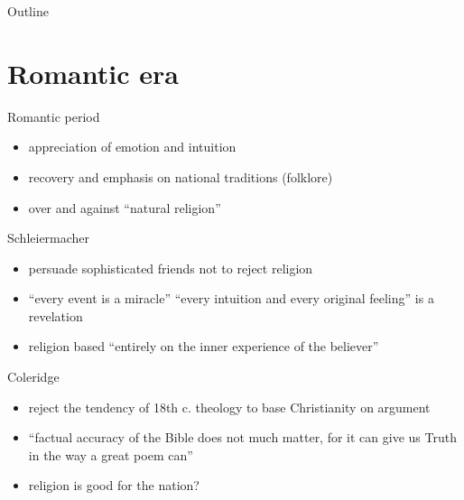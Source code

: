 

\maketitle
\begin{frame}{Outline}
\setcounter{tocdepth}{1}
\tableofcontents
\end{frame}

\section{Romantic era}
\label{sec-1}
\begin{frame}[label=sec-1-1]{Romantic period}
\begin{itemize}
\item appreciation of emotion and intuition
\item recovery and emphasis on national traditions (folklore)
\item over and against ``natural religion''
\end{itemize}
\end{frame}
\begin{frame}[label=sec-1-2]{Schleiermacher}
\begin{itemize}
\item persuade sophisticated friends not to reject religion
\item ``every event is a miracle'' ``every intuition and every original feeling'' is a revelation
\item religion based ``entirely on the inner experience of the believer''
\end{itemize}
\end{frame}
\begin{frame}[label=sec-1-3]{Coleridge}
\begin{itemize}
\item reject the tendency of 18th c. theology to base Christianity on argument
\item ``factual accuracy of the Bible does not much matter, for it can give us Truth in the way a great poem can''
\item religion is good for the nation?
\end{itemize}
\end{frame}

